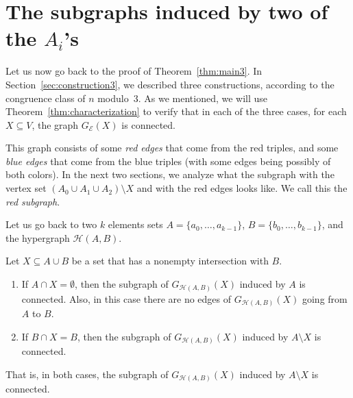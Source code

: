 \documentclass[11pt,a4paper]{article}
\begin{document}

\section{The subgraphs induced by two of the \texorpdfstring{$A_i$}{}'s}\label{sec:twoAi}

Let us now go back to the proof of Theorem~\ref{thm:main3}. In Section~\ref{sec:construction3}, we described three constructions, according to the congruence class of $n$ modulo~3. As we mentioned, we will use Theorem~\ref{thm:characterization} to verify that in each of the three cases, for each $X\subseteq V$, the graph $G_{\mathcal{E}}(X)$ is connected.

This graph consists of some {\em red edges} that come from the red triples, and some {\em blue edges} that come from the blue triples (with some edges being possibly of both colors). %
In the next two sections, we analyze what the subgraph with the vertex set $(A_0\cup A_1\cup A_2)\setminus X$ and with the red edges looks like. We call this the {\em red subgraph}.

Let us go back to two $k$ elements sets $A=\{a_0,\dots,a_{k-1}\}$, $B=\{b_0,\dots,b_{k-1}\}$, and the hypergraph $\mathcal{H}(A,B)$.

\begin{lemma}\label{lemma:connectedA}
Let $X\subseteq A\cup B$ be a set that has a nonempty intersection with $B$.
\begin{enumerate}
    \item[$(i)$.] If $A \cap X =\emptyset$, then the subgraph of $G_{\mathcal{H}(A,B)}(X)$ induced by $A$ is connected. Also, in this case there are no edges of $G_{\mathcal{H}(A,B)}(X)$ going from $A$ to $B$.
    \item[$(ii)$.] If  $B\cap X=B$, then the subgraph of $G_{\mathcal{H}(A,B)}(X)$ induced by $A\setminus X$ is connected.
\end{enumerate}
That is, in both cases, the subgraph of $G_{\mathcal{H}(A,B)}(X)$ induced by $A\setminus X$ is connected.
\end{lemma}
\end{document}
